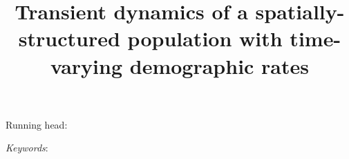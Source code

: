 \documentclass[11pt]{article}
\title{Transient dynamics of a spatially-structured population with time-varying demographic rates}
\date{}
\begin{document}
\raggedright
\setlength\parindent{0.25in}

\maketitle


% 
% 



\bigskip

Running head: {}


\linenumbers{}

\clearpage




\bigskip

\textit{Keywords}: {}











\end{document}

